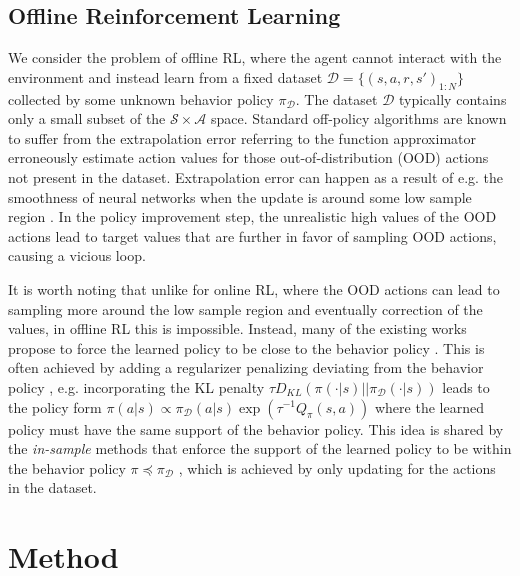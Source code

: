 \documentclass{article}
\newcommand{\AdaBracket}[1]{\left(#1\right)}
\newcommand{\KLany}[2]{D_{\!K\!L}\!\left(#1 \left|  \right| #2 \right)}
\newcommand{\datasetPolicy}{\pi_{\mathcal{D}}}
\begin{document}
\subsection{Offline Reinforcement Learning}

We consider the problem of offline RL, where the agent cannot interact with the environment and instead learn from a fixed dataset $\mathcal{D} = \{(s,a,r,s')_{1:N}\}$ collected by some unknown behavior policy $\datasetPolicy$.
The dataset $\mathcal{D}$ typically contains only a small subset of the $\mathcal{S}\times \mathcal{A}$ space.
Standard off-policy algorithms are known to suffer from the extrapolation error referring to the function approximator erroneously estimate action values for those out-of-distribution (OOD) actions not present in the dataset.
Extrapolation error can happen as a result of e.g. the smoothness of neural networks when the update is around some low sample region \cite{Gulcehre2021-regularizedBehavior}.
In the policy improvement step, the unrealistic high values of the OOD actions lead to target values that are further in favor of sampling OOD actions, causing a vicious loop. 

It is worth noting that unlike for online RL, where the OOD actions can lead to sampling more around the low sample region and eventually correction of the values, in offline RL this is impossible.
Instead, many of the existing works propose to force the learned policy to be close to the behavior policy \cite{Dadashi2021-pseudoMetricOffline,Fujimoto2019-InSampleMax,Fujimoto2021-minimalist,Nair2021-awac}.
This is often achieved by adding a regularizer penalizing deviating from the behavior policy \cite{Ghasemipour2021-EMaQ,Kumar2019-BootstrapErrorQlearningMMD,Jaques2020-OfflineDialog,Wu2020-BehaviorRegularizedAC}, e.g. incorporating the KL penalty $\tau\KLany{\pi(\cdot|s)}{\datasetPolicy(\cdot|s)}$ leads to the policy form $\pi(a|s)\propto\datasetPolicy(a|s)\exp\AdaBracket{\tau^{-1}Q_{\pi}(s,a)}$ where the learned policy must have the same support of the behavior policy.
This idea is shared by the \emph{in-sample} methods that enforce the support of the learned policy to be within the behavior policy $\pi \preceq \datasetPolicy$ \cite{Fujimoto2019-InSampleMax,Kostrikov2022-implicitQlearning,Xiao2023-InSampleSoftmax}, which is achieved by only updating for the actions in the dataset.



\section{Method}
\end{document}
